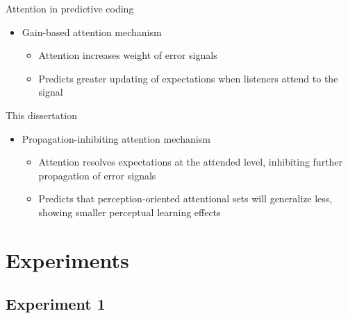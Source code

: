 \documentclass{beamer}
\begin{document}
\begin{frame}{Attention in predictive coding}
\citet{Clark2013}
\begin{itemize}
\item Gain-based attention mechanism
\begin{itemize}
\item Attention increases weight of error signals
\item Predicts greater updating of expectations when listeners attend to the signal
\end{itemize}
\end{itemize}
This dissertation
\begin{itemize}
\item Propagation-inhibiting attention mechanism
\begin{itemize}
\item Attention resolves expectations at the attended level, inhibiting further propagation of error signals
\item Predicts that perception-oriented attentional sets will generalize less, showing smaller perceptual learning effects
\end{itemize}
\end{itemize}
\end{frame}

\section{Experiments}

\subsection{Experiment 1}
\end{document}
